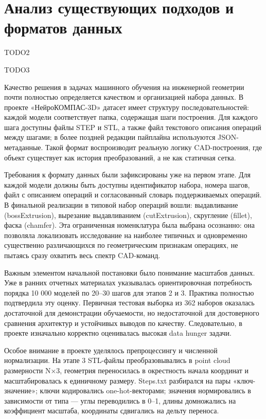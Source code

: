 \section{Анализ существующих подходов и форматов данных}

TODO2

TODO3

Качество решения в задачах машинного обучения на инженерной геометрии почти полностью определяется качеством и организацией набора данных. В проекте «НейроКОМПАС-3D» датасет имеет структуру последовательностей: каждой модели соответствует папка, содержащая шаги построения. Для каждого шага доступны файлы STEP и STL, а также файл текстового описания операций между шагами; в более поздней редакции пайплайна используются JSON-метаданные. Такой формат воспроизводит реальную логику CAD-построения, где объект существует как история преобразований, а не как статичная сетка.

Требования к формату данных были зафиксированы уже на первом этапе. Для каждой модели должны быть доступны идентификатор набора, номера шагов, файл с описанием операций и согласованный словарь поддерживаемых операций. В финальной реализации в типовой набор операций вошли: выдавливание (bossExtrusion), вырезание выдавливанием (cutExtrusion), скругление (fillet), фаска (chamfer). Эта ограниченная номенклатура была выбрана осознанно: она позволяла локализовать исследование на наиболее типичных и одновременно существенно различающихся по геометрическим признакам операциях, не пытаясь сразу охватить весь спектр CAD-команд.

Важным элементом начальной постановки было понимание масштабов данных. Уже в ранних отчетных материалах указывалась ориентировочная потребность порядка 10 000 моделей по 20–30 шагов для этапов 2 и 3. Практика полностью подтвердила эту оценку. Первичная тестовая выборка из 362 наборов оказалась достаточной для демонстрации обучаемости, но недостаточной для достоверного сравнения архитектур и устойчивых выводов по качеству. Следовательно, в проекте изначально корректно оценивалась высокая data hunger задачи.

Особое внимание в проекте уделялось препроцессингу и численной нормализации. На этапе 3 STL-файлы преобразовывались в point cloud размерности N×3, геометрия переносилась в окрестность начала координат и масштабировалась к единичному размеру. Steps.txt разбирался на пары «ключ-значение»; ключи кодировались one-hot-векторами; значения нормировались в зависимости от типа — углы переводились в 0–1, длины домножались на коэффициент масштаба, координаты сдвигались на дельту переноса.

